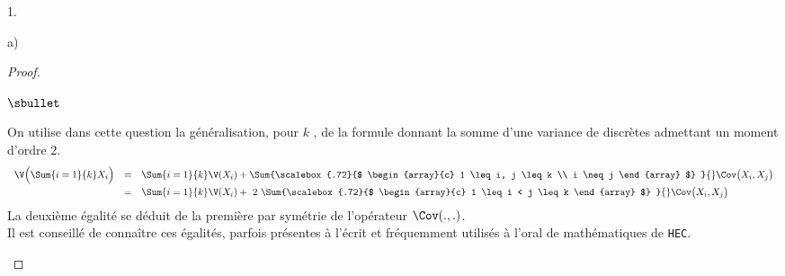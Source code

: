 \documentclass[11pt]{article}%
\begin{document}
\begin{noliste}{1.}
\begin{noliste}{a)}
\begin{proof}
\begin{remarkL}{.98}
\begin{noliste}{$\sbullet$}
        \item On utilise dans cette question la généralisation, pour
          $k$ \var, de la formule donnant la somme d'une variance de
          \var discrètes admettant un moment d'ordre $2$.
          \[
          \begin{array}{rcl}
            \V \Big(\Sum{i=1}{k} X_i \Big) & = & \Sum{i=1}{k} \V(X_i) +
            \Sum{%
              \scalebox{.72}{$
                \begin{array}{c}
                  1 \leq i, j \leq k \\
                  i \neq j
                \end{array}
                $}
            }{} \Cov\big(X_i, X_j \big)
            \\[.2cm]
            & = & \Sum{i=1}{k} \V(X_i) + \ 2 \ 
            \Sum{%
              \scalebox{.72}{$
                \begin{array}{c}
                  1 \leq i < j \leq k %
                \end{array}
                $}
            }{} \Cov\big(X_i, X_j \big)
          \end{array}
          \]
          La deuxième égalité se déduit de la première par symétrie de
          l'opérateur $\Cov(., .)$.\\
          Il est conseillé de connaître ces égalités, parfois
          présentes à l'écrit et fréquemment utilisés à l'oral de
          mathématiques de {\tt HEC}.

\end{noliste}
\end{remarkL}
\end{proof}
\end{noliste}
\end{noliste}
\end{document}
